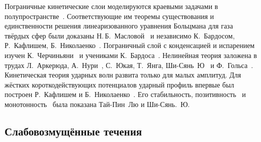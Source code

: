 Пограничные кинетические слои моделируются краевыми задачами в полупространстве~\cite{Grad1969}.
Соответствующие им теоремы существования и единственности решения линеаризованного уравнения Больцмана для газа твёрдых сфер
были доказаны Н.\,Б.~Масловой~\cite{Maslova1982} и независимо К.~Бардосом, Р.~Кафлишем, Б.~Николаенко~\cite{Bardos1986}.
Пограничный слой с конденсацией и испарением изучен К.~Черчиньяни~\cite{Cercignani1986}
и учениками К.~Бардоса~\cite{Coron1988}.
Нелинейная теория заложена в трудах Л.~Аркерюда, А.~Нури~\cite{Arkeryd2000},
С.~Юкая, Т.~Янга, Ши-Сянь~Ю~\cite{Ukai2003} и Ф.~Гольса~\cite{Golse2008}.
Кинетическая теория ударных волн развита только для малых амплитуд.
Для жёстких короткодействующих потенциалов ударный профиль впервые был построен Р.~Кафлишем и Б.~Николаенко~\cite{Caflisch1982}.
Его стабильность, позитивность~\cite{Liu2004} и монотонность~\cite{Liu2013} была показана Тай-Пин~Лю и Ши-Сянь.~Ю.

\subsection{Слабовозмущённые течения}

